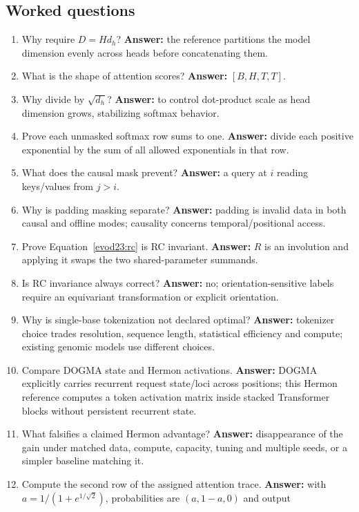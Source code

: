 \subsection*{Worked questions}
\begin{enumerate}
\item Why require $D=Hd_h$? \textbf{Answer:} the reference partitions the model
dimension evenly across heads before concatenating them.
\item What is the shape of attention scores? \textbf{Answer:} $[B,H,T,T]$.
\item Why divide by $\sqrt{d_h}$? \textbf{Answer:} to control dot-product scale as
head dimension grows, stabilizing softmax behavior.
\item Prove each unmasked softmax row sums to one. \textbf{Answer:} divide each
positive exponential by the sum of all allowed exponentials in that row.
\item What does the causal mask prevent? \textbf{Answer:} a query at $i$ reading
keys/values from $j>i$.
\item Why is padding masking separate? \textbf{Answer:} padding is invalid data in
both causal and offline modes; causality concerns temporal/positional access.
\item Prove Equation~\ref{evod23:rc} is RC invariant. \textbf{Answer:} $R$ is an
involution and applying it swaps the two shared-parameter summands.
\item Is RC invariance always correct? \textbf{Answer:} no; orientation-sensitive
labels require an equivariant transformation or explicit orientation.
\item Why is single-base tokenization not declared optimal?
\textbf{Answer:} tokenizer choice trades resolution, sequence length, statistical
efficiency and compute; existing genomic models use different choices.
\item Compare DOGMA state and Hermon activations. \textbf{Answer:} DOGMA explicitly
carries recurrent request state/loci across positions; this Hermon reference computes
a token activation matrix inside stacked Transformer blocks without persistent
recurrent state.
\item What falsifies a claimed Hermon advantage? \textbf{Answer:} disappearance of
the gain under matched data, compute, capacity, tuning and multiple seeds, or a
simpler baseline matching it.
\item Compute the second row of the assigned attention trace. \textbf{Answer:}
with $a=1/(1+e^{1/\sqrt2})$, probabilities are $(a,1-a,0)$ and output

\end{enumerate}
